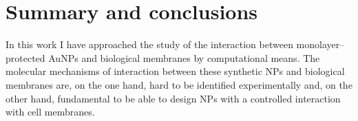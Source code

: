 \chapter{Summary and conclusions}
\label{chap:conclusions}
In this work I have approached the study of the interaction between monolayer--protected \acp{AuNP} and biological 
membranes by computational means. The molecular mechanisms of interaction between these synthetic \acp{NP} and 
biological membranes are, on the one hand, hard to be identified experimentally and, on the other hand, fundamental 
to be able to design \acp{NP} with a controlled interaction with cell membranes.
